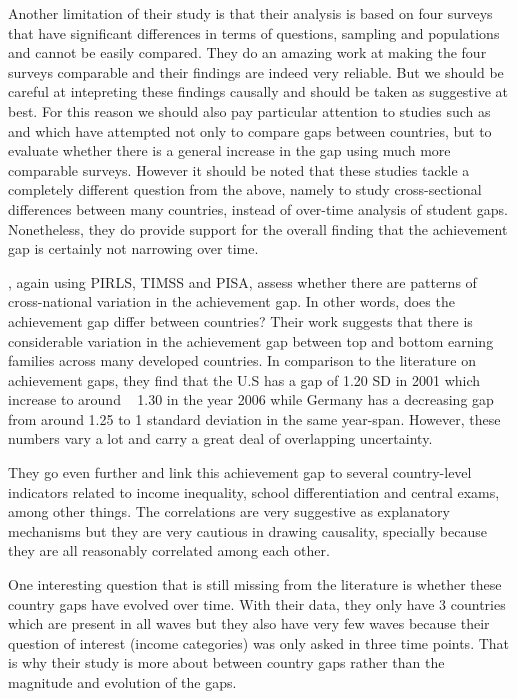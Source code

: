 \documentclass[11pt, a4paper]{article}\usepackage[]{graphicx}\usepackage[]{color}
\begin{document}
Another limitation of their study is that their analysis is based on four surveys that have significant differences in terms of questions, sampling and populations and cannot be easily compared. They do an amazing work at making the four surveys comparable and their findings are indeed very reliable.  But we should be careful at intepreting these findings causally and should be taken as suggestive at best. For this reason we should also pay particular attention to studies such as \citet{anna2016} and \citet{anna2016_global} which have attempted not only to compare gaps between countries, but to evaluate whether there is a general increase in the gap using much more comparable surveys. However it should be noted that these studies tackle a completely different question from the above, namely to study cross-sectional differences between many countries, instead of over-time analysis of student gaps. Nonetheless, they do provide support for the overall finding that the achievement gap is certainly not narrowing over time.

\citet{anna2016}, again using PIRLS, TIMSS and PISA, assess whether there are patterns of cross-national variation in the achievement gap. In other words, does the achievement gap differ between countries? Their work suggests that there is considerable variation in the achievement gap between top and bottom earning families across many developed countries. In comparison to the literature on achievement gaps, they find that the U.S has a gap of   1.20 SD in 2001 which increase to around ~ 1.30 in the year 2006 while Germany has a decreasing gap from around   1.25 to   1 standard deviation in the same year-span. However, these numbers vary a lot and carry a great deal of overlapping uncertainty.

They go even further and link this achievement gap to several country-level indicators related to income inequality, school differentiation and central exams, among other things. The correlations are very suggestive  as explanatory mechanisms but they are very cautious in drawing causality, specially because they are all reasonably correlated among each other.

One interesting question that is still missing from the literature is whether these country gaps have evolved over time. With their data, they only have 3 countries which are present in all waves but they also have very few waves because their question of interest (income categories) was only asked in three time points. That is why their study is more about between country gaps rather than the magnitude and evolution of the gaps.
\end{document}

